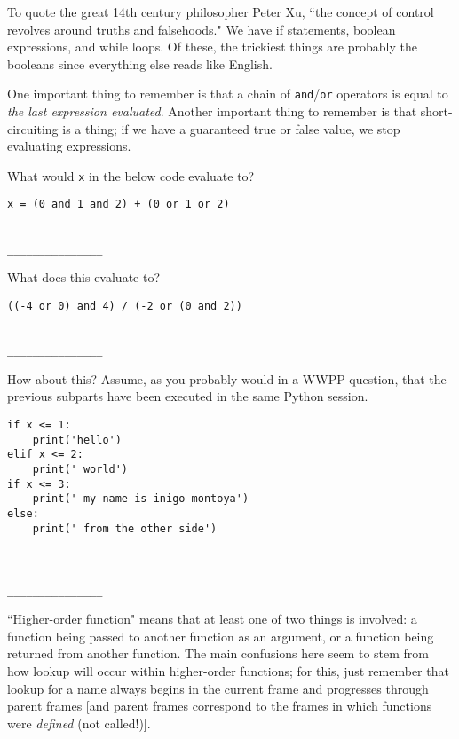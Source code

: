 \documentclass[twoside]{article}
\begin{document}
\begin{enumerate}


To quote the great 14th century philosopher Peter Xu, ``the concept of control revolves around truths and falsehoods." We have if statements, boolean expressions, and while loops. Of these, the trickiest things are probably the booleans since everything else reads like English.

One important thing to remember is that a chain of \texttt{and}/\texttt{or} operators is equal to \textit{the last expression evaluated}. Another important thing to remember is that short-circuiting is a thing; if we have a guaranteed true or false value, we stop evaluating expressions.

\begin{enumerate}
 What would \texttt{x} in the below code evaluate to?
\begin{lstlisting}
x = (0 and 1 and 2) + (0 or 1 or 2)
\end{lstlisting}
~\\
\lstinline{_______________}

 What does this evaluate to?
\begin{lstlisting}
((-4 or 0) and 4) / (-2 or (0 and 2))
\end{lstlisting}
~\\
\lstinline{_______________}

 How about this? Assume, as you probably would in a WWPP question, that the previous subparts have been executed in the same Python session.
\begin{lstlisting}
if x <= 1:
    print('hello')
elif x <= 2:
    print(' world')
if x <= 3:
    print(' my name is inigo montoya')
else:
    print(' from the other side')
\end{lstlisting}
~\\~\\
\lstinline{_______________}

\end{enumerate}


``Higher-order function" means that at least one of two things is involved: a function being passed to another function as an argument, or a function being returned from another function. The main confusions here seem to stem from how lookup will occur within higher-order functions; for this, just remember that lookup for a name always begins in the current frame and progresses through parent frames [and parent frames correspond to the frames in which functions were \textit{defined} (not called!)].


\end{enumerate}
\end{document}
